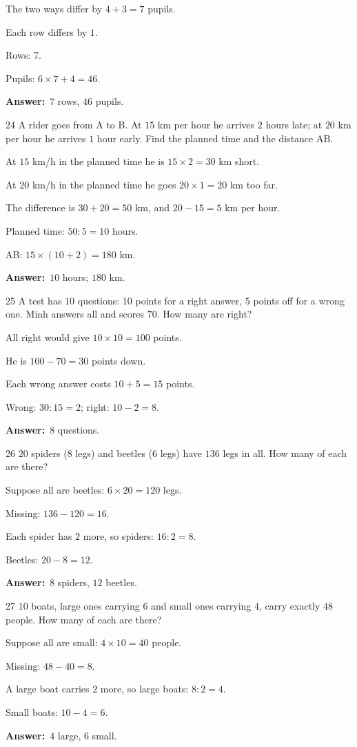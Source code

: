 \documentclass[11pt]{article}
\newif\ifsol \solfalse
\providecommand{\AnsWord}{Đáp số}
\newcommand{\dapso}[1]{\par\textbf{\AnsWord:}\ #1}
\newcommand{\probsol}[1]{%
  \begin{lrbox}{\solmeasure}\begin{minipage}{\dimexpr\linewidth-24pt\relax}#1\end{minipage}\end{lrbox}%
  \ifsol
    \begin{solbox}#1\end{solbox}%
  \else
    \setlength{\solht}{\dimexpr\ht\solmeasure+\dp\solmeasure+0.85cm\relax}%
    \ifdim\solht<1.35cm\setlength{\solht}{1.35cm}\fi
    \begin{tcolorbox}[colback=white,colframe=Line,boxrule=0.8pt,arc=5pt,
      left=8pt,right=8pt,top=4pt,bottom=4pt,height=\solht]{\footnotesize\color{Slate}\itshape\WorkWord}\end{tcolorbox}%
  \fi}
\newcommand{\gap}{\vspace{0.3cm}}
\def\WorkWord{Your work:}
\def\AnsWord{Answer}
\begin{document}
\probsol{
The two ways differ by $4+3=7$ pupils.\par Each row differs by $1$.\par Rows: $7$.\par Pupils: $6\times7+4=46$.
\dapso{$7$ rows, $46$ pupils.}}
\gap
\begin{probbox}{24}{\relax}
A rider goes from A to B. At $15$ km per hour he arrives $2$ hours late; at $20$ km per hour he arrives $1$ hour early. Find the planned time and the distance AB.
\end{probbox}
\probsol{
At $15$ km/h in the planned time he is $15\times2=30$ km short.\par At $20$ km/h in the planned time he goes $20\times1=20$ km too far.\par The difference is $30+20=50$ km, and $20-15=5$ km per hour.\par Planned time: $50:5=10$ hours.\par AB: $15\times(10+2)=180$ km.
\dapso{$10$ hours; $180$ km.}}
\gap
\begin{probbox}{25}{\relax}
A test has $10$ questions: $10$ points for a right answer, $5$ points off for a wrong one. Minh answers all and scores $70$. How many are right?
\end{probbox}
\probsol{
All right would give $10\times10=100$ points.\par He is $100-70=30$ points down.\par Each wrong answer costs $10+5=15$ points.\par Wrong: $30:15=2$; right: $10-2=8$.
\dapso{$8$ questions.}}
\gap
\begin{probbox}{26}{\relax}
$20$ spiders ($8$ legs) and beetles ($6$ legs) have $136$ legs in all. How many of each are there?
\end{probbox}
\probsol{
Suppose all are beetles: $6\times20=120$ legs.\par Missing: $136-120=16$.\par Each spider has $2$ more, so spiders: $16:2=8$.\par Beetles: $20-8=12$.
\dapso{$8$ spiders, $12$ beetles.}}
\gap
\begin{probbox}{27}{\relax}
$10$ boats, large ones carrying $6$ and small ones carrying $4$, carry exactly $48$ people. How many of each are there?
\end{probbox}
\probsol{
Suppose all are small: $4\times10=40$ people.\par Missing: $48-40=8$.\par A large boat carries $2$ more, so large boats: $8:2=4$.\par Small boats: $10-4=6$.
\dapso{$4$ large, $6$ small.}}
\end{document}
